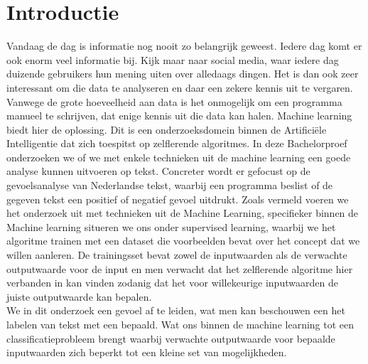 \chapter{Introductie}\label{introductie}
Vandaag de dag is informatie nog nooit zo belangrijk geweest. Iedere dag komt er ook enorm veel informatie bij. Kijk maar naar social media, waar iedere dag duizende gebruikers hun mening uiten over alledaags dingen. Het is dan ook zeer interessant om die data te analyseren en daar een zekere kennis uit te vergaren. Vanwege de grote hoeveelheid aan data is het onmogelijk om een programma manueel te schrijven, dat enige kennis uit die data kan halen. Machine learning biedt hier de oplossing. Dit is een onderzoeksdomein binnen de Artifici\"ele Intelligentie dat zich toespitst op zelflerende algoritmes. In deze Bachelorproef onderzoeken we of we met enkele technieken uit de machine learning een goede analyse kunnen uitvoeren op tekst. Concreter wordt er gefocust op de gevoelsanalyse van Nederlandse tekst, waarbij een programma beslist of de gegeven tekst een positief of negatief gevoel uitdrukt.
%
Zoals vermeld voeren we het onderzoek uit met technieken uit de Machine Learning, specifieker binnen de Machine learning situeren we ons onder supervised learning, waarbij we het algoritme trainen met een dataset die voorbeelden bevat over het concept dat we willen aanleren. De trainingsset bevat zowel de inputwaarden als de verwachte outputwaarde voor de input en men verwacht dat het zelflerende algoritme hier verbanden in kan vinden zodanig dat het voor willekeurige inputwaarden de juiste outputwaarde kan bepalen. \\
%
We in dit onderzoek een gevoel af te leiden, wat men kan beschouwen een het labelen van tekst met een bepaald. Wat ons binnen de machine learning tot een classificatieprobleem brengt waarbij verwachte outputwaarde voor bepaalde inputwaarden zich beperkt tot een kleine set van mogelijkheden.\\
%
